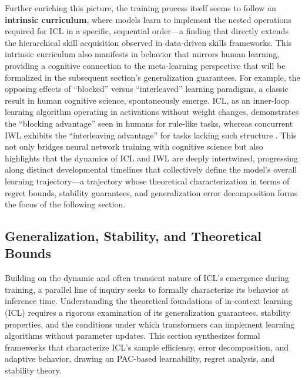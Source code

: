 \documentclass[11pt]{article}
\begin{document}
Further enriching this picture, the training process itself seems to follow an \textbf{intrinsic curriculum}, where models learn to implement the nested operations required for ICL in a specific, sequential order---a finding that directly extends the hierarchical skill acquisition observed in data-driven skills frameworks. This intrinsic curriculum also manifests in behavior that mirrors human learning, providing a cognitive connection to the meta-learning perspective that will be formalized in the subsequent section's generalization guarantees. For example, the opposing effects of ``blocked'' versus ``interleaved'' learning paradigms, a classic result in human cognitive science, spontaneously emerge. ICL, as an inner-loop learning algorithm operating in activations without weight changes, demonstrates the ``blocking advantage'' seen in humans for rule-like tasks, whereas concurrent IWL exhibits the ``interleaving advantage'' for tasks lacking such structure \cite{ref75}. This not only bridges neural network training with cognitive science but also highlights that the dynamics of ICL and IWL are deeply intertwined, progressing along distinct developmental timelines that collectively define the model's overall learning trajectory---a trajectory whose theoretical characterization in terms of regret bounds, stability guarantees, and generalization error decomposition forms the focus of the following section.

\subsection{Generalization, Stability, and Theoretical Bounds}

Building on the dynamic and often transient nature of ICL's emergence during training, a parallel line of inquiry seeks to formally characterize its behavior at inference time. Understanding the theoretical foundations of in-context learning (ICL) requires a rigorous examination of its generalization guarantees, stability properties, and the conditions under which transformers can implement learning algorithms without parameter updates. This section synthesizes formal frameworks that characterize ICL's sample efficiency, error decomposition, and adaptive behavior, drawing on PAC-based learnability, regret analysis, and stability theory.
\end{document}
